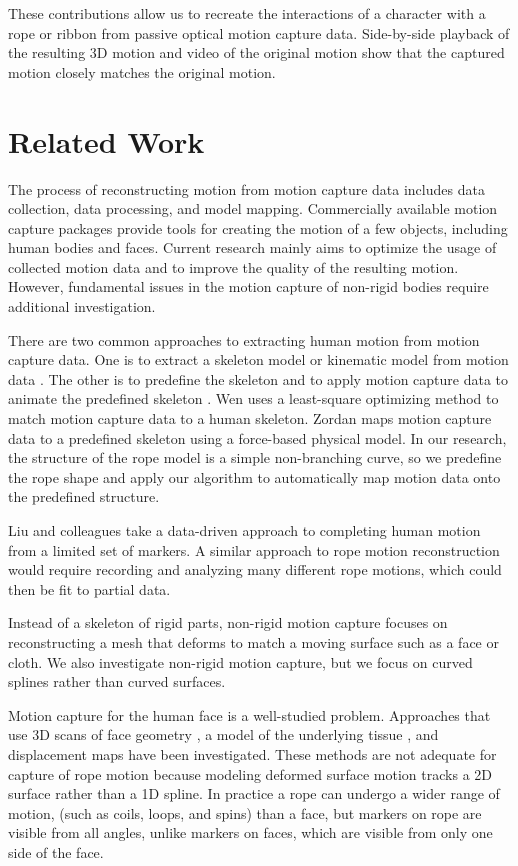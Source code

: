 These contributions allow us to recreate the interactions of a character with a rope or ribbon from passive optical motion capture data. Side-by-side playback of the resulting 3D motion and video of the original motion show that the captured motion closely matches the original motion.


\section{Related Work} 

The process of reconstructing motion from motion capture data includes data collection, data processing, and model mapping. Commercially available motion capture packages provide tools for creating the motion of a few objects, including human bodies and faces. Current research mainly aims to optimize the usage of collected motion data and to improve the quality of the resulting motion.  However, fundamental issues in the motion capture of non-rigid bodies require additional investigation.  

There are two common approaches to extracting human motion from motion capture data. One is to extract a skeleton model or kinematic model from motion data \cite{Lou:EHM2010,Rajko:2007:RAK}. The other is to predefine the skeleton and to apply motion capture data to animate the predefined skeleton \cite{Wen:2006:MCD,ZordanVictorBrian2003}. Wen \cite{Wen:2006:MCD} uses a least-square optimizing method to match motion capture data to a human skeleton. Zordan \cite{ZordanVictorBrian2003} maps motion capture data to a predefined skeleton using a force-based physical model. In our research, the structure of the rope model is a simple non-branching curve, so we predefine the rope shape and apply our algorithm to automatically map motion data onto the predefined structure.

Liu and colleagues \cite{Liu:tvcj06} take a data-driven approach to completing human motion from a limited set of markers.  A similar approach to rope motion reconstruction would require recording and analyzing many different rope motions, which could then be fit to partial data.  

Instead of a skeleton of rigid parts, non-rigid motion capture focuses on reconstructing a mesh that deforms to match a moving surface such as a face or cloth.  We also investigate non-rigid motion capture, but we focus on curved splines rather than curved surfaces.  

Motion capture for the human face is a well-studied problem.  Approaches that use 3D scans of face geometry \cite{bickel:siggraph07,park:tog06}, a model of the underlying tissue \cite{SifakisEftychios2005}, and displacement maps \cite{Ma:FPS2008,Lorenzo03} have been investigated.  These methods are not adequate for capture of rope motion because modeling deformed surface motion tracks a 2D surface rather than a 1D spline.  In practice a rope can undergo a wider range of motion, (such as coils, loops, and spins) than a face, but markers on rope are visible from all angles, unlike markers on faces, which are visible from only one side of the face.  

